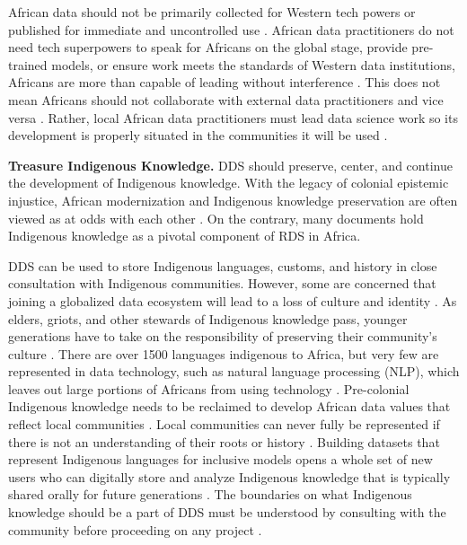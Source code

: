 African data should not be primarily collected for Western tech powers or published for immediate and uncontrolled use \cite{birhane2020algorithmic,hountondji2004producing}. African data practitioners do not need tech superpowers to speak for Africans on the global stage, provide pre-trained models, or ensure work meets the standards of Western data institutions, Africans are more than capable of leading without interference \cite{ndjungu2020blood,abebe2021narratives,goffi2023teaching,mhlambi2023decolonizing, okolo2023responsible, ade-ibijola2023artificial, biko2004black}. This does not mean Africans should not collaborate with external data practitioners and vice versa \cite{hountondji2004producing, eke2023introducing}. 
Rather, local African data practitioners must lead data science work so its development is properly situated in the communities it will be used \cite{nwankwo2019africa,lauer2017african,kiemde2022towards, eke2023towards}.  


\textbf{Treasure Indigenous Knowledge.}
\label{sec:treasure_ik}
DDS should preserve, center, and continue the development of Indigenous knowledge. With the legacy of colonial epistemic injustice, African modernization and Indigenous knowledge preservation are often viewed as at odds with each other \cite{african_union2024continental,kohnert2022machine,eke2023introducing}. On the contrary, many documents hold Indigenous knowledge as a pivotal component of RDS in Africa. 

DDS can be used to store Indigenous languages, customs, and history in close consultation with Indigenous communities. However, some are concerned that joining a globalized data ecosystem will lead to a loss of culture and identity \cite{african_union2024continental, abebe2021narratives,eke2023towards, ade-ibijola2023artificial}. As elders, griots, and other stewards of Indigenous knowledge pass,
younger generations have to take on the responsibility of preserving their community's culture
\cite{kotut2024griot,ramose2004struggle}. 
There are over 1500 languages indigenous to Africa, but very few are represented in data technology, such as natural language processing (NLP), which leaves out large portions of Africans from using technology \cite{shilongo2023creativity}. Pre-colonial Indigenous knowledge needs to be reclaimed to develop African data values that reflect local communities \cite{abdul2023transhumanism, chan2021limits}. Local communities can never fully be represented if there is not an understanding of their roots or history \cite{ramose2004struggle}. Building datasets that represent Indigenous languages for inclusive models opens a whole set of new users who can digitally store and analyze Indigenous knowledge that is typically shared orally for future generations \cite{shilongo2023creativity,moahi2007globalization}. 
The boundaries on what Indigenous knowledge should be a part of DDS must be understood by consulting with the community before proceeding on any project \cite{kotut2024griot,moahi2007globalization}.

